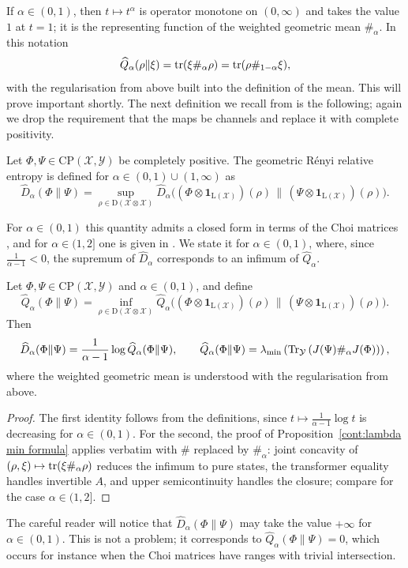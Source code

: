 If $\alpha\in (0,1)$, then $t\mapsto t^\alpha$ is operator monotone on $(0,\infty)$ and takes the value $1$ at $t=1$; it is the representing function of the weighted geometric mean $\#_\alpha$. In this notation
\[
\widehat{Q}_\alpha(\rho\|\xi)=\operatorname{tr}(\xi\#_\alpha\rho)=\operatorname{tr}(\rho\#_{1-\alpha}\xi),
\]
with the regularisation from above built into the definition of the mean. This will prove important shortly. 
The next definition we recall from \cite{KatariyaWilde2021} is the following; again we drop the requirement that the maps be channels and replace it with complete positivity.
\begin{definition}
Let $\Phi,\Psi\in \mathrm{CP}(\mathcal{X},\mathcal{Y})$ be completely positive. The geometric R\'enyi relative entropy is defined for $\alpha\in (0,1)\cup (1,\infty)$ as 
\[
    \widehat{D}_\alpha(\Phi\|\Psi)=\sup_{\rho\in \mathrm{D}(\mathcal{X}\otimes \mathcal{X})}\widehat{D}_\alpha\big((\Phi\otimes\mathbf{1}_{\mathrm{L}(\mathcal{X})})(\rho)\,\|\,(\Psi\otimes\mathbf{1}_{\mathrm{L}(\mathcal{X})})(\rho)\big).
\]
\end{definition}
For $\alpha\in(0,1)$ this quantity admits a closed form in terms of the Choi matrices \cite{KatariyaWilde2021}, and for $\alpha\in(1,2]$ one is given in \cite[Lemma~5]{FangFawzi2021}. We state it for $\alpha\in (0,1)$, where, since $\frac{1}{\alpha-1}<0$, the supremum of $\widehat{D}_\alpha$ corresponds to an infimum of $\widehat{Q}_\alpha$. 
\begin{lemma}\label{cont:renyi closed form}
Let $\Phi,\Psi\in \mathrm{CP}(\mathcal{X},\mathcal{Y})$ and $\alpha\in (0,1)$, and define 
\[\widehat{Q}_\alpha(\Phi\|\Psi)=\inf_{\rho\in \mathrm{D}(\mathcal{X}\otimes \mathcal{X})}\widehat{Q}_\alpha\big((\Phi\otimes\mathbf{1}_{\mathrm{L}(\mathcal{X})})(\rho)\,\|\,(\Psi\otimes\mathbf{1}_{\mathrm{L}(\mathcal{X})})(\rho)\big).\] Then
\[
\widehat{D}_\alpha(\Phi\|\Psi)=\frac{1}{\alpha-1}\log\widehat{Q}_\alpha(\Phi\|\Psi),\qquad \widehat{Q}_\alpha(\Phi\|\Psi)=\lambda_{\min}\left(\operatorname{Tr}_{\mathcal{Y}}\left(J(\Psi)\#_\alpha J(\Phi)\right)\right),
\]
where the weighted geometric mean is understood with the regularisation from above.
\end{lemma}
\begin{proof}
The first identity follows from the definitions, since $t\mapsto\frac{1}{\alpha-1}\log t$ is decreasing for $\alpha\in(0,1)$. For the second, the proof of Proposition~\ref{cont:lambda min formula} applies verbatim with $\#$ replaced by $\#_\alpha$: joint concavity of $(\rho,\xi)\mapsto\operatorname{tr}(\xi\#_\alpha\rho)$ \cite{KuboAndo1980} reduces the infimum to pure states, the transformer equality \cite{KuboAndo1980} handles invertible $A$, and upper semicontinuity handles the closure; compare \cite[Lemma~5]{FangFawzi2021} for the case $\alpha\in(1,2]$.
\end{proof}
The careful reader will notice that $\widehat{D}_\alpha(\Phi\|\Psi)$ may take the value $+\infty$ for $\alpha\in(0,1)$. This is not a problem; it corresponds to $\widehat{Q}_\alpha(\Phi\|\Psi)=0$, which occurs for instance when the Choi matrices have ranges with trivial intersection.
 
